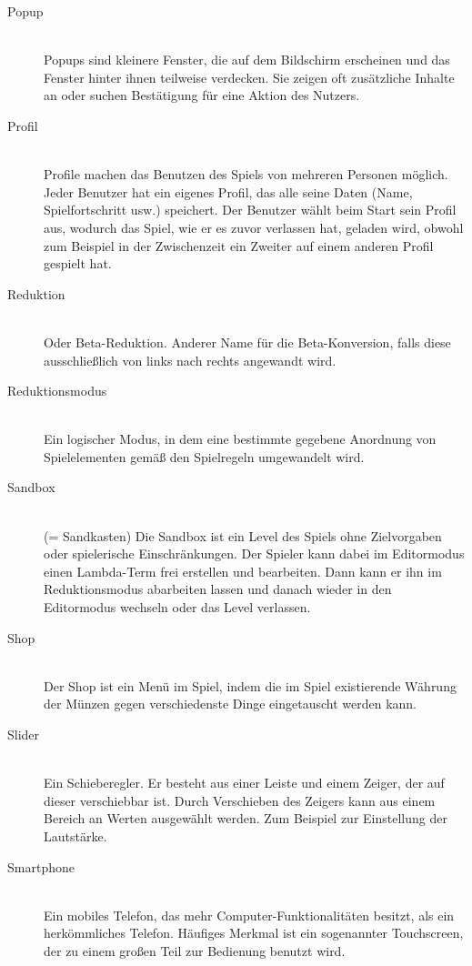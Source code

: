 \begin{description}
	\item[Popup] \hfill \\
	Popups sind kleinere Fenster, die auf dem Bildschirm erscheinen und das Fenster hinter ihnen teilweise verdecken.
	Sie zeigen oft zusätzliche Inhalte an oder suchen Bestätigung für eine Aktion des Nutzers.
	
	\item[Profil] \hfill \\
	Profile machen das Benutzen des Spiels von mehreren Personen möglich. Jeder Benutzer hat ein eigenes Profil,
	das alle seine Daten (Name, Spielfortschritt usw.) speichert. Der Benutzer wählt beim Start sein Profil aus, wodurch das Spiel,
	wie er es zuvor verlassen hat, geladen wird, obwohl zum Beispiel in der Zwischenzeit ein Zweiter auf einem anderen Profil gespielt hat.
	
	\item[Reduktion] \hfill \\
	Oder Beta-Reduktion. Anderer Name für die Beta-Konversion, falls diese ausschließlich von links nach rechts angewandt wird.
	
	\item[Reduktionsmodus] \hfill \\
	Ein logischer Modus, in dem eine bestimmte gegebene Anordnung von Spielelementen gemäß den Spielregeln umgewandelt wird.
	
	\item[Sandbox] \hfill \\
	(= Sandkasten) Die Sandbox ist ein Level des Spiels ohne Zielvorgaben oder spielerische Einschränkungen. Der Spieler kann dabei im Editormodus
	einen Lambda-Term frei erstellen und bearbeiten. Dann kann er ihn im Reduktionsmodus abarbeiten lassen und danach wieder in den 
	Editormodus wechseln oder das Level verlassen.
	
	\item[Shop] \hfill \\
	Der Shop ist ein Menü im Spiel, indem die im Spiel existierende Währung der Münzen gegen verschiedenste Dinge eingetauscht werden kann.
	
	\item[Slider] \hfill \\
	Ein Schieberegler. Er besteht aus einer Leiste und einem Zeiger, der auf dieser verschiebbar ist. Durch Verschieben des Zeigers kann aus 
	einem Bereich an Werten ausgewählt werden. Zum Beispiel zur Einstellung der Lautstärke.
	
	\item[Smartphone] \hfill \\
	Ein mobiles Telefon, das mehr Computer-Funktionalitäten besitzt, als ein herkömmliches Telefon. Häufiges Merkmal ist ein sogenannter
	Touchscreen, der zu einem großen Teil zur Bedienung benutzt wird.
	

\end{description}
